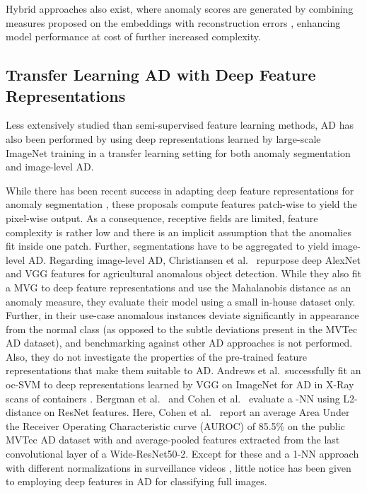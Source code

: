 \documentclass[conference, a4paper]{./template/IEEEtran}
\begin{document}
Hybrid approaches also exist, where anomaly scores are generated by combining measures proposed on the embeddings with reconstruction errors \cite{Abati2019, Zong2018, Vasilev2018}, enhancing model performance at cost of further increased complexity.

\subsection{Transfer Learning AD with Deep Feature Representations}
Less extensively studied than semi-supervised feature learning methods, AD has also been performed by using deep representations learned by large-scale ImageNet training in a transfer learning setting for both anomaly segmentation and image-level AD.

While there has been recent success in adapting deep feature representations for anomaly segmentation \cite{Sabokrou2018, Napoletano2018, Bergmann2020}, these proposals compute features patch-wise to yield the pixel-wise output. As a consequence, receptive fields are limited, feature complexity is rather low and there is an implicit assumption that the anomalies fit inside one patch.
Further, segmentations have to be aggregated to yield image-level AD.
Regarding image-level AD, Christiansen et al.\ \cite{Christiansen2016} repurpose deep AlexNet \cite{Krizhevsky2012} and VGG \cite{Simonyan2015} features for agricultural anomalous object detection.
While they also fit a MVG to deep feature representations and use the Mahalanobis distance as an anomaly measure, they evaluate their model using a small in-house dataset only.
Further, in their use-case anomalous instances deviate significantly in appearance from the normal class (as opposed to the subtle deviations present in the MVTec AD dataset), and benchmarking against other AD approaches is not performed. Also, they do not investigate the properties of the pre-trained feature representations that make them suitable to AD.
Andrews et al.\ successfully fit an oc-SVM to deep representations learned by VGG on ImageNet for AD in X-Ray scans of containers \cite{Andrews2016}.
Bergman et al.\ \cite{Bergman2020a} and Cohen et al.\ \cite{Cohen2020} evaluate a -NN using L2-distance on ResNet \cite{He2016} features.
Here, Cohen et al.\ \cite{Cohen2020} report an average Area Under the Receiver Operating Characteristic curve (AUROC) of 85.5\% on the public MVTec AD dataset with  and average-pooled features extracted from the last convolutional layer of a Wide-ResNet50-2.
Except for these and a 1-NN approach with different normalizations in surveillance videos \cite{Nazare2018}, little notice has been given to employing deep features in AD for classifying full images. 
\end{document}
